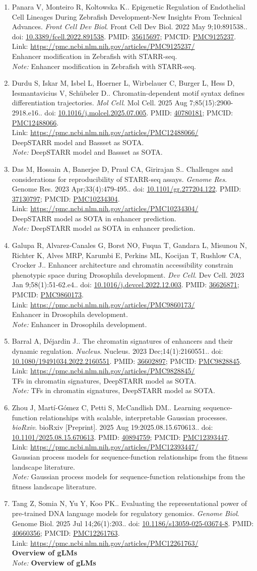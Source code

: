 \documentclass[12pt]{article}
\newcommand{\Pub}[9]{%
  \item #1. #2. \textit{#3}. #4. doi: \href{https://doi.org/#5}{#5}. PMID: \href{https://pubmed.ncbi.nlm.nih.gov/#6/}{#6}; PMCID: \href{https://www.ncbi.nlm.nih.gov/pmc/articles/#7/}{#7}. \\
  \noindent Link: \url{#8}\\
  \ifx#9\relax\else\\\textit{Note:} #9\fi
}
\begin{document}
\begin{enumerate}[leftmargin=*,label=\textbf{\arabic*.}]
\Pub{Panara V, Monteiro R, Koltowska K.}{Epigenetic Regulation of Endothelial Cell Lineages During Zebrafish Development-New Insights From Technical Advances}{Front Cell Dev Biol}{Front Cell Dev Biol. 2022 May 9;10:891538.}{10.3389/fcell.2022.891538}{35615697}{PMC9125237}{https://pmc.ncbi.nlm.nih.gov/articles/PMC9125237/}{Enhancer modification in Zebrafish with STARR-seq.}

\Pub{Durdu S, Iskar M, Isbel L, Hoerner L, Wirbelauer C, Burger L, Hess D, Iesmantavicius V, Schübeler D.}{Chromatin-dependent motif syntax defines differentiation trajectories}{Mol Cell}{Mol Cell. 2025 Aug 7;85(15):2900-2918.e16.}{10.1016/j.molcel.2025.07.005}{40780181}{PMC12488066}{https://pmc.ncbi.nlm.nih.gov/articles/PMC12488066/}{DeepSTARR model and Bassset as SOTA.}

\newpage

\Pub{Das M, Hossain A, Banerjee D, Praul CA, Girirajan S.}{Challenges and considerations for reproducibility of STARR-seq assays}{Genome Res}{Genome Res. 2023 Apr;33(4):479-495.}{10.1101/gr.277204.122}{37130797}{PMC10234304}{https://pmc.ncbi.nlm.nih.gov/articles/PMC10234304/}{DeepSTARR model as SOTA in enhancer prediction.}

\Pub{Galupa R, Alvarez-Canales G, Borst NO, Fuqua T, Gandara L, Misunou N, Richter K, Alves MRP, Karumbi E, Perkins ML, Kocijan T, Rushlow CA, Crocker J.}{Enhancer architecture and chromatin accessibility constrain phenotypic space during Drosophila development}{Dev Cell}{Dev Cell. 2023 Jan 9;58(1):51-62.e4.}{10.1016/j.devcel.2022.12.003}{36626871}{PMC9860173}{https://pmc.ncbi.nlm.nih.gov/articles/PMC9860173/}{Enhancer in Drosophila development.}

\Pub{Barral A, Déjardin J.}{The chromatin signatures of enhancers and their dynamic regulation}{Nucleus}{Nucleus. 2023 Dec;14(1):2160551.}{10.1080/19491034.2022.2160551}{36602897}{PMC9828845}{https://pmc.ncbi.nlm.nih.gov/articles/PMC9828845/}{TFs in chromatin signatures, DeepSTARR model as SOTA.}

\Pub{Zhou J, Martí-Gómez C, Petti S, McCandlish DM.}{Learning sequence-function relationships with scalable, interpretable Gaussian processes}{bioRxiv}{bioRxiv [Preprint]. 2025 Aug 19:2025.08.15.670613.}{10.1101/2025.08.15.670613}{40894759}{PMC12393447}{https://pmc.ncbi.nlm.nih.gov/articles/PMC12393447/}{ Gaussian process models for sequence-function relationships from the fitness landscape literature.}

\Pub{Tang Z, Somia N, Yu Y, Koo PK.}{Evaluating the representational power of pre-trained DNA language models for regulatory genomics}{Genome Biol}{Genome Biol. 2025 Jul 14;26(1):203.}{10.1186/s13059-025-03674-8}{40660356}{PMC12261763}{https://pmc.ncbi.nlm.nih.gov/articles/PMC12261763/}{\textbf{Overview of gLMs}}


\end{enumerate}
\end{document}
